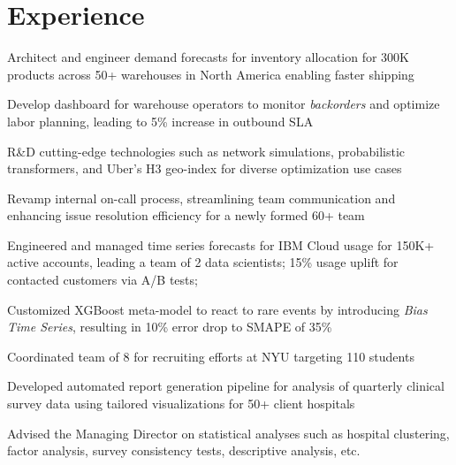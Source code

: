 \documentclass[]{deedy-resume-openfont}
\begin{document}
\hfill
\begin{minipage}[t]{0.66\textwidth} 


\section{Experience}

\vspace{\topsep} %
\begin{tightemize}
\item Architect and engineer demand forecasts for inventory allocation for 300K products across 50+ warehouses in North America enabling faster shipping
\item Develop dashboard for warehouse operators to monitor \textit{backorders} and optimize labor planning, leading to 5\% increase in outbound SLA
\item R\&D cutting-edge technologies such as network simulations, probabilistic transformers, and Uber's H3 geo-index for diverse optimization use cases
\item Revamp internal on-call process, streamlining team communication and enhancing issue resolution efficiency for a newly formed 60+ team

\end{tightemize}
\sectionsep

\begin{tightemize}
\item Engineered and managed time series forecasts for IBM Cloud usage for 150K+ active accounts, leading a team of 2 data scientists; 15\% usage uplift for contacted customers via A/B tests;
\item Customized XGBoost meta-model to react to rare events by introducing \textit{Bias Time Series}, resulting in 10\% error drop to SMAPE of 35\%
\item Coordinated team of 8 for recruiting efforts at NYU targeting 110 students
\end{tightemize}
\sectionsep

\begin{tightemize}
\item Developed automated report generation pipeline for analysis of quarterly clinical survey data using tailored visualizations for 50+ client hospitals
\item Advised the Managing Director on statistical analyses such as hospital clustering, factor analysis, survey consistency tests, descriptive analysis, etc.
\end{tightemize}
\sectionsep


\end{minipage}
\end{document}
